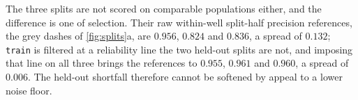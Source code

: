 The three splits are not scored on comparable populations either, and the
difference is one of selection. Their raw within-well split-half precision
references, the grey dashes of \cref{fig:splits}a, are $0.956$, $0.824$ and
$0.836$, a spread of $0.132$; \texttt{train}
is filtered at a reliability line the two held-out splits are not, and imposing
that line on all three brings the references to $0.955$, $0.961$ and $0.960$, a
spread of $0.006$. The held-out shortfall therefore cannot be softened by appeal
to a lower noise floor.

%

